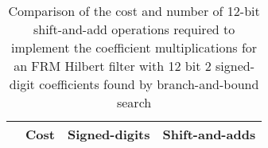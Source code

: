 \documentclass[a4paper,twoside,10pt,english]{report}
\begin{document}
\begin{table}[htb]
\centering
\begin{threeparttable}
\begin{tabular}{lccc}  \\ \toprule
& Cost&Signed-digits&Shift-and-adds\\ \midrule

\bottomrule
\end{tabular}
\end{threeparttable}
\caption[Summary of cost results for the FRM Hilbert filter with exact and
12 bit 2 signed-digit coefficients found by the branch-and-bound algorithm]
{Comparison of the cost and number of 12-bit shift-and-add operations required 
  to implement the coefficient multiplications for an FRM Hilbert filter
  with 12 bit 2 signed-digit coefficients found by branch-and-bound search}
\label{tab:branch-bound-schurOneMAPlattice-frm-Hilbert-12-nbits-cost}
\end{table}
\clearpage
\end{document}

